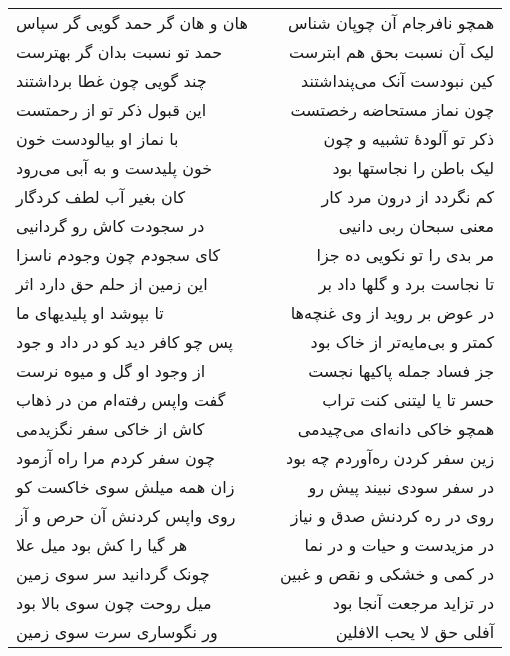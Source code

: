 \begin{center}
\begin{longtable}{l p{0.5cm} r}
هان و هان گر حمد گویی گر سپاس
&&
همچو نافرجام آن چوپان شناس
\\
حمد تو نسبت بدان گر بهترست
&&
لیک آن نسبت بحق هم ابترست
\\
چند گویی چون غطا برداشتند
&&
کین نبودست آنک می‌پنداشتند
\\
این قبول ذکر تو از رحمتست
&&
چون نماز مستحاضه رخصتست
\\
با نماز او بیالودست خون
&&
ذکر تو آلودهٔ تشبیه و چون
\\
خون پلیدست و به آبی می‌رود
&&
لیک باطن را نجاستها بود
\\
کان بغیر آب لطف کردگار
&&
کم نگردد از درون مرد کار
\\
در سجودت کاش رو گردانیی
&&
معنی سبحان ربی دانیی
\\
کای سجودم چون وجودم ناسزا
&&
مر بدی را تو نکویی ده جزا
\\
این زمین از حلم حق دارد اثر
&&
تا نجاست برد و گلها داد بر
\\
تا بپوشد او پلیدیهای ما
&&
در عوض بر روید از وی غنچه‌ها
\\
پس چو کافر دید کو در داد و جود
&&
کمتر و بی‌مایه‌تر از خاک بود
\\
از وجود او گل و میوه نرست
&&
جز فساد جمله پاکیها نجست
\\
گفت واپس رفته‌ام من در ذهاب
&&
حسر تا یا لیتنی کنت تراب
\\
کاش از خاکی سفر نگزیدمی
&&
همچو خاکی دانه‌ای می‌چیدمی
\\
چون سفر کردم مرا راه آزمود
&&
زین سفر کردن ره‌آوردم چه بود
\\
زان همه میلش سوی خاکست کو
&&
در سفر سودی نبیند پیش رو
\\
روی واپس کردنش آن حرص و آز
&&
روی در ره کردنش صدق و نیاز
\\
هر گیا را کش بود میل علا
&&
در مزیدست و حیات و در نما
\\
چونک گردانید سر سوی زمین
&&
در کمی و خشکی و نقص و غبین
\\
میل روحت چون سوی بالا بود
&&
در تزاید مرجعت آنجا بود
\\
ور نگوساری سرت سوی زمین
&&
آفلی حق لا یحب الافلین
\\
\end{longtable}
\end{center}
